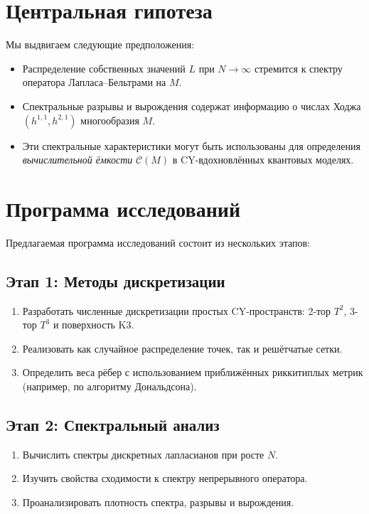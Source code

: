 \documentclass[12pt,a4paper]{article}
\begin{document}
\section{Центральная гипотеза}
Мы выдвигаем следующие предположения:
\begin{itemize}
\item Распределение собственных значений $L$ при $N \to \infty$ 
стремится к спектру оператора Лапласа–Бельтрами на $M$.  
\item Спектральные разрывы и вырождения содержат информацию о числах Ходжа 
$(h^{1,1}, h^{2,1})$ многообразия $M$.  
\item Эти спектральные характеристики могут быть использованы для определения 
\emph{вычислительной ёмкости} $\mathcal{C}(M)$ 
в CY-вдохновлённых квантовых моделях.  
\end{itemize}

\section{Программа исследований}
Предлагаемая программа исследований состоит из нескольких этапов:

\subsection{Этап 1: Методы дискретизации}
\begin{enumerate}
\item Разработать численные дискретизации простых CY-пространств: 
2-тор $T^2$, 3-тор $T^3$ и поверхность K3.  
\item Реализовать как случайное распределение точек, так и решётчатые сетки.  
\item Определить веса рёбер с использованием приближённых риккитиплых метрик 
(например, по алгоритму Дональдсона).  
\end{enumerate}

\subsection{Этап 2: Спектральный анализ}
\begin{enumerate}
\item Вычислить спектры дискретных лапласианов при росте $N$.  
\item Изучить свойства сходимости к спектру непрерывного оператора.  
\item Проанализировать плотность спектра, разрывы и вырождения.  
\end{enumerate}
\end{document}

